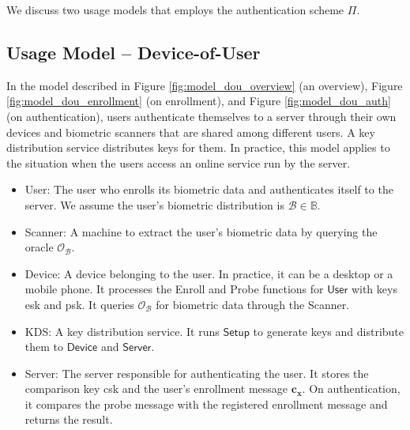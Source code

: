 \noindent 
We discuss two usage models that employs the authentication scheme $\Pi$.




\subsection{Usage Model – Device-of-User}
\label{sec:dou_model}

In the model described in Figure \ref{fig:model_dou_overview} (an overview), Figure \ref{fig:model_dou_enrollment} (on enrollment), and Figure \ref{fig:model_dou_auth} (on authentication), users authenticate themselves to a server through their own devices and biometric scanners that are shared among different users.
A key distribution service distributes keys for them. In practice, this model applies to the situation when the users access an online service run by the server.

\begin{itemize}

	\item \textsf{User}: The user who enrolls its biometric data and authenticates itself to the server. We assume the user's biometric distribution is $\mathcal{B} \in \mathbb{B}$. 

	\item \textsf{Scanner}: A machine to extract the user's biometric data by querying the oracle $\mathcal{O}_{\mathcal{B}}$.
	
	\item \textsf{Device}: A device belonging to the user. In practice, it can be a desktop or a mobile phone. It processes the \textsf{Enroll} and \textsf{Probe} functions for $\textsf{User}$ with keys \textsf{esk} and \textsf{psk}. It queries $\mathcal{O}_{\mathcal{B}}$ for biometric data through the \textsf{Scanner}.
	
	\item \textsf{KDS}: A key distribution service. It runs $\textsf{Setup}$ to generate keys and distribute them to $\textsf{Device}$ and $\textsf{Server}$.
		
	\item \textsf{Server}: The server responsible for authenticating the user. It stores the comparison key \textsf{csk} and the user's enrollment message $\mathbf{c_x}$. On authentication, it compares the probe message with the registered enrollment message and returns the result.  

\end{itemize}

